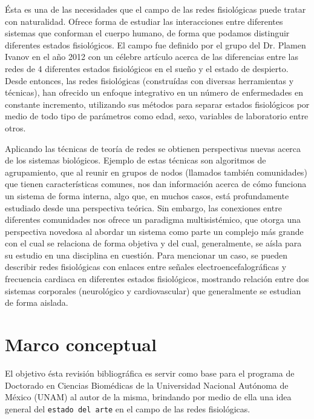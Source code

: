 \documentclass[twoside,twocolumn]{article}
\begin{document}
Ésta es una de las necesidades que el campo de las redes fisiológicas puede tratar con naturalidad.
Ofrece forma de estudiar las interacciones entre diferentes sistemas que conforman el cuerpo humano, de forma que podamos distinguir diferentes estados fisiológicos.
El campo fue definido por el grupo del Dr. Plamen Ivanov en el año 2012 con un célebre artículo acerca de las diferencias entre las redes de 4 diferentes estados fisiológicos en el sueño y el estado de despierto\cite{bashan2012network}.
Desde entonces, las redes fisiológicas (construídas con diversas herramientas y técnicas), han ofrecido un enfoque integrativo en un número de enfermedades en constante incremento, utilizando sus métodos para separar estados fisiológicos por medio de todo tipo de parámetros como edad, sexo, variables de laboratorio entre otros\cite{ivanov2016focus}.

Aplicando las técnicas de teoría de redes se obtienen perspectivas nuevas acerca de los sistemas biológicos.
Ejemplo de estas técnicas son algoritmos de agrupamiento, que al reunir en grupos de nodos (llamados también comunidades) que tienen características comunes, nos dan información acerca de cómo funciona un sistema de forma interna, algo que, en muchos casos, está profundamente estudiado desde una perspectiva teórica.
Sin embargo, las conexiones entre diferentes comunidades nos ofrece un paradigma multisistémico, que otorga una perspectiva novedosa al abordar un sistema como parte un complejo más grande con el cual se relaciona de forma objetiva y del cual, generalmente, se aísla para su estudio en una disciplina en cuestión.
Para mencionar un caso, se pueden describir redes fisiológicas con enlaces entre señales electroencefalográficas y frecuencia cardiaca en diferentes estados fisiológicos, mostrando relación entre dos sistemas corporales (neurológico y cardiovascular) que generalmente se estudian de forma aislada\cite{campos2018hipertension}.


\section{Marco conceptual}
El objetivo ésta revisión bibliográfica es servir como base para el programa de Doctorado en Ciencias Biomédicas de la Universidad Nacional Autónoma de México (UNAM) al autor de la misma, brindando por medio de ella una idea general del \texttt{estado del arte} en el campo de las redes fisiológicas.
\end{document}
